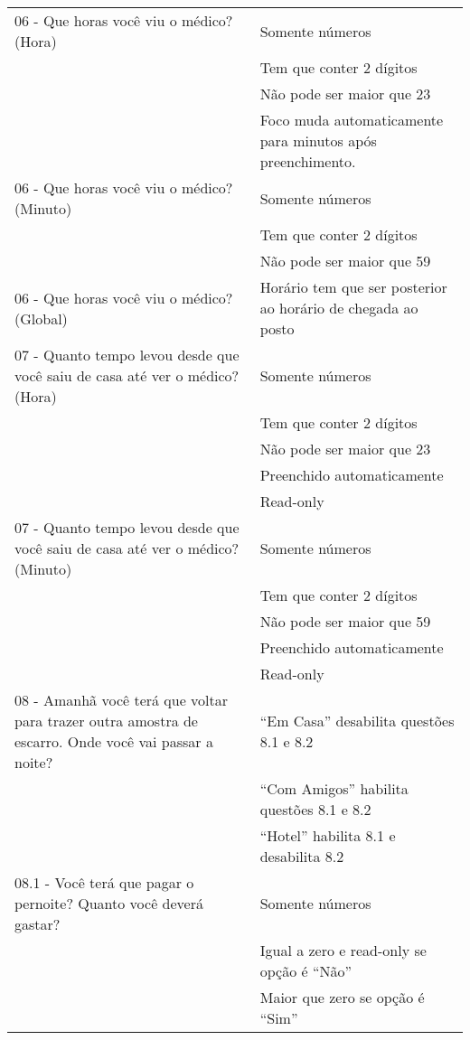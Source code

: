 \begin{longtable}{p{}|p{}}
06 - Que horas você viu o médico? (Hora) & Somente números \\ \cline{2-2}  & Tem que conter 2 dígitos \\ \cline{2-2} & Não pode ser maior que 23 \\ \cline{2-2} & Foco muda automaticamente para minutos após preenchimento.  \\ \hline
06 - Que horas você viu o médico? (Minuto) & Somente números \\ \cline{2-2}  & Tem que conter 2 dígitos \\ \cline{2-2} & Não pode ser maior que 59 \\ \hline
06 - Que horas você viu o médico? (Global) & Horário tem que ser posterior ao horário de chegada ao posto \\ \hline

07 - Quanto tempo levou desde que você saiu de casa até ver o médico? (Hora) & Somente números \\ \cline{2-2}  & Tem que conter 2 dígitos \\ \cline{2-2} & Não pode ser maior que 23 \\ \cline{2-2} & Preenchido automaticamente  \\ \cline{2-2} & Read-only\\ \hline
07 - Quanto tempo levou desde que você saiu de casa até ver o médico? (Minuto) & Somente números \\ \cline{2-2}  & Tem que conter 2 dígitos \\ \cline{2-2} & Não pode ser maior que 59 \\ \cline{2-2} & Preenchido automaticamente  \\ \cline{2-2} & Read-only \\ \hline 

08 - Amanhã você terá que voltar para trazer outra amostra de escarro. Onde você vai passar a noite? & ``Em Casa'' desabilita questões 8.1 e 8.2 \\ \cline{2-2} & ``Com Amigos'' habilita questões 8.1 e 8.2 \\ \cline{2-2} & ``Hotel'' habilita 8.1 e desabilita 8.2 \\ \hline

08.1 - Você terá que pagar o pernoite? Quanto você deverá gastar? & Somente números \\ \cline{2-2} & Igual a zero e read-only se opção é ``Não'' \\ \cline{2-2} & Maior que zero se opção é ``Sim'' \\ \hline


\end{longtable}
